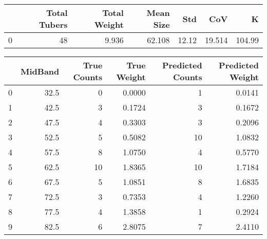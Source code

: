 \begin{tabular}{lrrrrrr}
\toprule
{} &  Total Tubers &  Total Weight &  Mean Size &    Std &     CoV &       K \\
\midrule
0 &            48 &         9.936 &     62.108 &  12.12 &  19.514 &  104.99 \\
\bottomrule
\end{tabular}

\begin{tabular}{lrrrrr}
\toprule
{} &  MidBand &  True Counts &  True Weight &  Predicted Counts &  Predicted Weight \\
\midrule
0 &     32.5 &            0 &       0.0000 &                 1 &            0.0141 \\
1 &     42.5 &            3 &       0.1724 &                 3 &            0.1672 \\
2 &     47.5 &            4 &       0.3303 &                 3 &            0.2096 \\
3 &     52.5 &            5 &       0.5082 &                10 &            1.0832 \\
4 &     57.5 &            8 &       1.0750 &                 4 &            0.5770 \\
5 &     62.5 &           10 &       1.8365 &                10 &            1.7184 \\
6 &     67.5 &            5 &       1.0851 &                 8 &            1.6835 \\
7 &     72.5 &            3 &       0.7353 &                 4 &            1.2260 \\
8 &     77.5 &            4 &       1.3858 &                 1 &            0.2924 \\
9 &     82.5 &            6 &       2.8075 &                 7 &            2.4110 \\
\bottomrule
\end{tabular}

